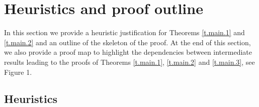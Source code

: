 \documentclass[10pt,twoside]{article}
\numberwithin{theorem}{section}
\begin{document}
\section{Heuristics and proof outline}\label{s.heuristics_outline}

In this section we provide a heuristic justification for Theorems \ref{t.main.1} and \ref{t.main.2} and an outline of the skeleton of the proof. At the end of this section, we also provide a proof map to highlight the dependencies between intermediate results leading to the proofs of Theorems \ref{t.main.1}, \ref{t.main.2} and \ref{t.main.3}, see Figure 1.\\

\subsection{Heuristics}\label{ss.heuristics}
\end{document}
